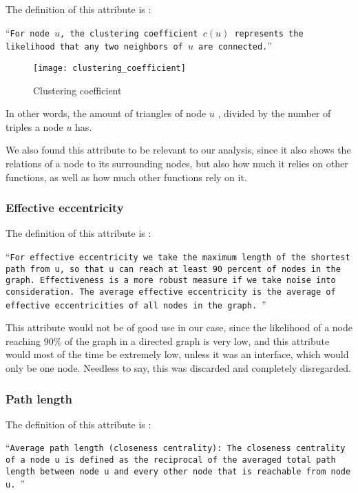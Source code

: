 The definition of this attribute is :

\enquote{\texttt{For node $u$, the clustering coefficient $c(u)$ represents the likelihood that any two neighbors of $u$ are connected.}}\parencite{graphClassification}

\begin{figure}[!htb]
	\caption{Clustering coefficient}
	\centering
	\texttt{[image: clustering\_coefficient]}
\end{figure}

In other words, the amount of triangles of node $u$ , divided by the number of triples a node $u$ has.

We also found this attribute to be relevant to our analysis, since it also shows the relations of a node to its surrounding nodes, but also how much it relies on other functions, as well as how much other functions rely on it.

\subsubsection{Effective eccentricity}

The definition of this attribute is :

\enquote{\texttt{For effective eccentricity we take the
		maximum length of the shortest path from u, so that
		u can reach at least 90 percent of nodes in the graph.
		Effectiveness is a more robust measure if we take noise
		into consideration. The average effective eccentricity
		is the average of effective eccentricities of all nodes in the graph.
}}\parencite{graphClassification}

This attribute would not be of good use in our case, since the likelihood of a node reaching 90\% of the graph in a directed graph is very low, and this attribute would most of the time be extremely low, unless it was an interface, which would only be one node. Needless to say, this was discarded and completely disregarded.

\subsubsection{Path length}

The definition of this attribute is :

\enquote{\texttt{Average path length (closeness centrality): The
		closeness centrality of a node u is defined as the reciprocal of the averaged total path length between node
		u and every other node that is reachable from node
		u.		
}}\parencite{graphClassification}

